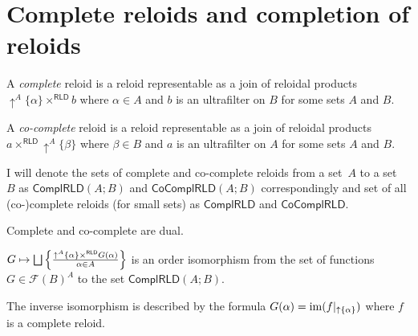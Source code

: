 \section{Complete reloids and completion of reloids}
\begin{defn}
A \emph{complete} reloid is a reloid representable
as a join of reloidal products $\uparrow^{A}\{\alpha\}\times^{\mathsf{RLD}}b$
where $\alpha\in A$ and $b$ is an ultrafilter on $B$ for some sets
$A$ and $B$.
\end{defn}

\begin{defn}
A \emph{co-complete} reloid is a reloid
representable as a join of reloidal products $a\times^{\mathsf{RLD}}\uparrow^{A}\{\beta\}$
where $\beta\in B$ and $a$ is an ultrafilter on $A$ for some sets
$A$ and $B$.
\end{defn}
I will denote the sets of complete and co-complete reloids from a set~$A$ to a set~$B$ as
$\mathsf{ComplRLD}(A;B)$ and $\mathsf{CoComplRLD}(A;B)$ correspondingly and
set of all (co-)complete reloids (for small sets)
as $\mathsf{ComplRLD}$ and $\mathsf{CoComplRLD}$.
\begin{obvious}
Complete and co-complete are dual.\end{obvious}
\begin{thm}
\label{complrld-rep}$G\mapsto\bigsqcup\left\{ \frac{\uparrow^{A}\{\alpha\}\times^{\mathsf{RLD}}G(\alpha)}{\alpha\in A}\right\}$
is an order isomorphism from the set of functions $G\in\mathscr{F}(B)^{A}$
to the set $\mathsf{ComplRLD}(A;B)$.

The inverse isomorphism is described by the formula $G(\alpha)=\operatorname{im}(f|_{\uparrow \{\alpha\}})$
where $f$ is a complete reloid.\end{thm}
